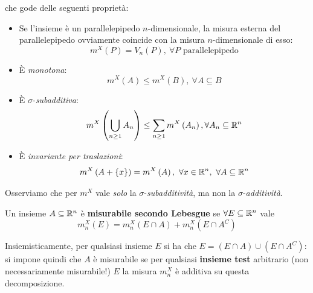 	che gode delle seguenti proprietà:
	\begin{itemize}
		\item Se l'insieme è un parallelepipedo $n$-dimensionale, la misura esterna del parallelepipedo ovviamente coincide con la misura $n$-dimensionale di esso:
		\begin{equation}
			m^X(P)=V_n(P),\ \forall P\text{ parallelepipedo}
		\end{equation}
		\item È \textit{monotona}:
		\begin{equation}
			m^X\left(A\right)\leq m^X\left(B\right),\ \forall A\subseteq B
		\end{equation}
		\item È $\sigma$-\textit{subadditiva}:
		\begin{equation}
			m^X\left(\bigcup_{n\geq 1}A_n\right)\leq \sum_{n\geq 1}m^X\left(A_n\right), \forall A_n\subseteq \mathbb{R}^n
		\end{equation}
		\item È \textit{invariante per traslazioni}:
		\begin{equation}
			m^X\left(A+\left\{x\right\}\right)=m^X\left(A\right),\ \forall x\in\realset^n,\ \forall A\subseteq\realset^n
		\end{equation}
	\end{itemize}
	Osserviamo che per $m^X$ vale \textit{solo} la  $\sigma$-\textit{subadditività}, ma non la $\sigma$-\textit{additività}.
	\begin{define}
		Un insieme $A\subseteq\mathbb{R}^n$ è \textbf{misurabile secondo Lebesgue} se $\forall E\subseteq\mathbb{R}^n$ vale
		\begin{equation}
			m_n^X(E)=m_n^X\left(E\cap A\right)+m_n^X\left(E\cap A^C\right)
		\end{equation}
	\end{define}
	Insiemisticamente, per qualsiasi insieme $E$ si ha che $E=(E\cap A) \cup (E\cap A^C)$: si impone quindi che $A$ è misurabile se per qualsiasi \textbf{insieme test} arbitrario (non necessariamente misurabile!) $E$ la misura $m_n^X$ è additiva su questa decomposizione.
